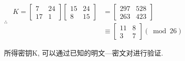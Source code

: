 \documentclass[UTF8]{ctexart}
\begin{document}
\begin{itemize}
\begin{enumerate}
\begin{itemize}
                $\therefore$
                $
                \begin{aligned}
                    K=\left[ \begin{array}{cc}{7} &{24}\\ {17} &{1} \end{array}\right]\left[ \begin{array}{cc}{15} &{24}\\ {8} &{15} \end{array}\right]
                            &=\left[ \begin{array}{cc}{297} &{528}\\ {263} &{423} \end{array}\right]\\
                                &\equiv \left[ \begin{array}{cc}{11} &{8}\\ {3} &{7} \end{array}\right](\bmod 26)
                \end{aligned}
                $

                所得密钥K, 可以通过已知的明文---密文对进行验证.
            \end{itemize}
        \end{enumerate}
    \end{itemize}
\end{document}
